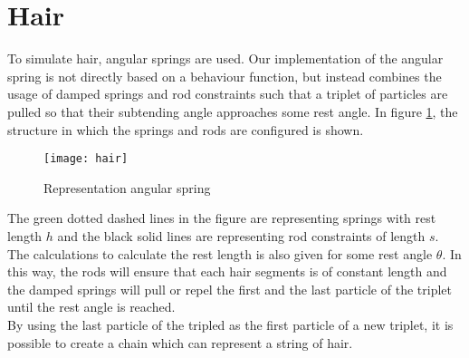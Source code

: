 \section{Hair}
To simulate hair, angular springs are used. Our implementation of the angular spring is not directly based on a behaviour function, but instead combines the usage of damped springs and rod constraints such that a triplet of particles are pulled so that their subtending angle approaches some rest angle. In figure \ref{fig:Angular Spring}, the structure in which the springs and rods are configured is shown. \\
\begin{figure}[h]
    \centering
    \texttt{[image: hair]}
    \caption{Representation angular spring}
    \label{fig:Angular Spring}
\end{figure}
The green dotted dashed lines in the figure are representing springs with rest length $h$ and the black solid lines are representing rod constraints of length $s$. The calculations to calculate the rest length is also given for some rest angle $\theta$. In this way, the rods will ensure that each hair segments is of constant length and the damped springs will pull or repel the first and the last particle of the triplet until the rest angle is reached.\\
By using the last particle of the tripled as the first particle of a new triplet, it is possible to create a chain which can represent a string of hair. 